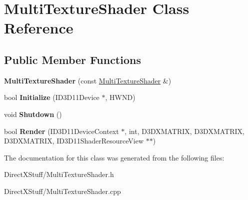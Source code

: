 \hypertarget{class_multi_texture_shader}{\section{Multi\-Texture\-Shader Class Reference}
\label{class_multi_texture_shader}
}
\subsection*{Public Member Functions}
\begin{DoxyCompactItemize}
\item 
\hypertarget{class_multi_texture_shader_afff241433e1bbe5284fd84a33ee8c282}{{\bfseries Multi\-Texture\-Shader} (const \hyperlink{class_multi_texture_shader}{Multi\-Texture\-Shader} \&)}\label{class_multi_texture_shader_afff241433e1bbe5284fd84a33ee8c282}

\item 
\hypertarget{class_multi_texture_shader_a0878054881e7887bc626d754ff068560}{bool {\bfseries Initialize} (I\-D3\-D11\-Device $\ast$, H\-W\-N\-D)}\label{class_multi_texture_shader_a0878054881e7887bc626d754ff068560}

\item 
\hypertarget{class_multi_texture_shader_a7cbc96dbf299ab0dc41316877ad28412}{void {\bfseries Shutdown} ()}\label{class_multi_texture_shader_a7cbc96dbf299ab0dc41316877ad28412}

\item 
\hypertarget{class_multi_texture_shader_ae76199a77b09e3cb9a60b18dc05a9256}{bool {\bfseries Render} (I\-D3\-D11\-Device\-Context $\ast$, int, D3\-D\-X\-M\-A\-T\-R\-I\-X, D3\-D\-X\-M\-A\-T\-R\-I\-X, D3\-D\-X\-M\-A\-T\-R\-I\-X, I\-D3\-D11\-Shader\-Resource\-View $\ast$$\ast$)}\label{class_multi_texture_shader_ae76199a77b09e3cb9a60b18dc05a9256}

\end{DoxyCompactItemize}


The documentation for this class was generated from the following files\-:\begin{DoxyCompactItemize}
\item 
Direct\-X\-Stuff/Multi\-Texture\-Shader.\-h\item 
Direct\-X\-Stuff/Multi\-Texture\-Shader.\-cpp\end{DoxyCompactItemize}
